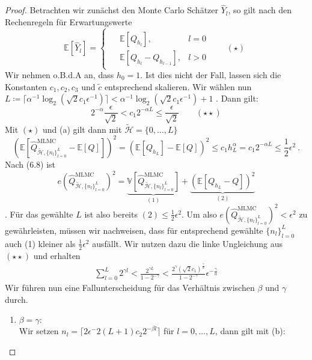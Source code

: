 \begin{proof}
	Betrachten wir zunächst den Monte Carlo Schätzer $ \widehat{Y}_l $, so gilt nach den Rechenregeln für Erwartungswerte 
	\[
		\mathbb{E}[\widehat{Y}_l] = 
			\begin{cases}
				\begin{array}{llr}
						&\mathbb{E}[Q_{h_l}] , &l=0 \\
						&\mathbb{E}[Q_{h_l}-Q_{h_{l-1}}] , &l>0
				\end{array} \qquad (\star)
			\end{cases}
	\]
	Wir nehmen o.B.d.A an, dass $ h_0 = 1 $. Ist dies nicht der Fall, lassen sich die Konstanten $ c_1,c_2,c_3 $ und $ \tilde{c} $ entsprechend skalieren.
	Wir wählen nun $ L \coloneqq \lceil \alpha^{-1} \log_2 (\sqrt{2}c_1\epsilon^{-1}) \rceil < \alpha^{-1} \log_2 (\sqrt{2}c_1\epsilon^{-1}) +1 $ . 
	Dann gilt:
	\[
	2^{-\alpha} \frac{\epsilon}{\sqrt{2}} < c_1 2^{-\alpha  L} \leq \frac{\epsilon}{\sqrt{2}}  \qquad (\star \star)
	\]
	Mit $ (\star) $ und (a) gilt dann mit $ \tilde{\mathcal{H}} = \{0,\dots,L\} $
	\[
	\left( \mathbb{E}[\widehat{Q}_{\tilde{\mathcal{H}},\{ n_l \}_{l=0}^L }^{\text{MLMC}} - \mathbb{E}[Q]] \right)^2 = \left( \mathbb{E}[Q_{h_L}] - \mathbb{E}[Q] \right)^2  \leq c_1 h_L^{\alpha} = c_1 2^{-\alpha L} \leq \frac{1}{2} \epsilon^2 \ .
	\]
	Nach (6.8) ist
	\[ 
	 	e(\widehat{Q}_{\tilde{\mathcal{H}},\{ n_l \}_{l=0}^L }^{\text{MLMC}})^2 	= \underbrace{	\mathbb{V}[\widehat{Q}_{\tilde{\mathcal{H}},\{ n_l \}_{l=0}^L }^{\text{MLMC}}]}_{(1)} + \underbrace{\left( \mathbb{E}[Q_{h_L}-Q] \right)^2}_{(2)}	
	\].
	Für das gewählte $ L $ ist also bereits $ (2) \leq \frac{1}{2}\epsilon^2 $.
	Um also $ e(\widehat{Q}_{\tilde{\mathcal{H}},\{ n_l \}_{l=0}^L }^{\text{MLMC}})^2 < \epsilon^2 $ zu gewährleisten, müssen wir nachweisen, dass für entsprechend gewählte $ \{n_l\}_{l=0}^L $ auch (1) kleiner als $ \frac{1}{2}\epsilon^2 $ ausfällt.
	Wir nutzen dazu die linke Ungleichung aus $ (\star \star) $ und erhalten 
	\begin{align}
		\sum_{l=0}^{L} 2^{\gamma l} < \frac{2^{\gamma L}}{1 - 2^{- \gamma}} < \frac{2^{\gamma}(\sqrt{2}c_1)^{ \frac{\gamma }{\alpha} }}{1-2^{-\gamma}} \epsilon^{-\frac{\gamma}{\alpha}}
	\end{align}
	Wir führen nun eine Fallunterscheidung für das Verhältnis zwischen $ \beta $ und $ \gamma $ durch.
	\begin{enumerate}[label=(\roman*)]
		\item $ \beta = \gamma: $\\
		Wir setzen $ n_l = \lceil 2\epsilon^-2(L+1)c_2 2^{-\beta l} \rceil $ für $ l= 0,\dots,L $, dann gilt mit (b):

\end{enumerate}
\end{proof}

